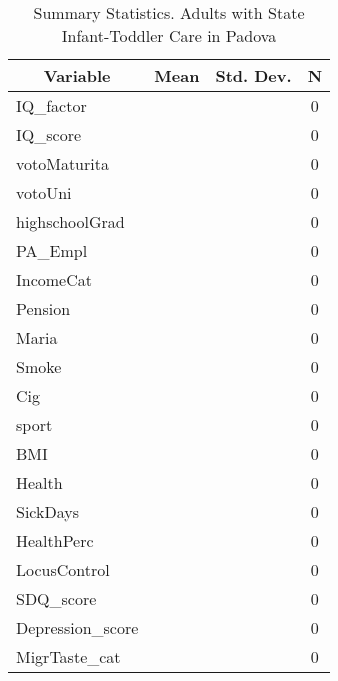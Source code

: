
\begin{table}[htbp]\centering \caption{Summary Statistics. Adults with State Infant-Toddler Care in Padova \label{bothAdultasiloStatPadova}}
\begin{tabular}{l c c  c}\hline\hline
\multicolumn{1}{c}{\textbf{Variable}} & \textbf{Mean}
 & \textbf{Std. Dev.} & \textbf{N}\\ \hline
IQ\_factor &  &   & 0\\
IQ\_score &  &   & 0\\
votoMaturita &  &   & 0\\
votoUni &  &   & 0\\
highschoolGrad &  &   & 0\\
PA\_Empl &  &   & 0\\
IncomeCat &  &   & 0\\
Pension &  &   & 0\\
Maria &  &   & 0\\
Smoke &  &   & 0\\
Cig &  &   & 0\\
sport &  &   & 0\\
BMI &  &   & 0\\
Health &  &   & 0\\
SickDays &  &   & 0\\
HealthPerc &  &   & 0\\
LocusControl &  &   & 0\\
SDQ\_score &  &   & 0\\
Depression\_score &  &   & 0\\
MigrTaste\_cat &  &   & 0\\
\hline\end{tabular}
\end{table}
